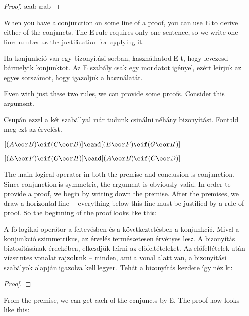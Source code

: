 \begin{proof}
	 \ae{ab}
	 \ae{ab}
\end{proof}



When you have a conjunction on some line of a proof, you can use {\eand}E to derive either of the conjuncts. The {\eand}E rule requires only one sentence, so we write one line number as the justification for applying it.

Ha konjunkció van egy bizonyítási sorban, használhatod {\eand}E-t, hogy levezesd bármelyik konjunktot. Az {\eand}E szabály csak egy mondatot igényel, ezért leírjuk az egyes sorszámot, hogy igazoljuk a használatát.

Even with just these two rules, we can provide some proofs. Consider this argument.

Csupán ezzel a két szabállyal már tudunk csinálni néhány bizonyítást.
Fontold meg ezt az érvelést.

\begin{earg}
\item[] $[(A\eor B)\eif(C\eor D)] \eand [(E \eor F) \eif (G\eor H)]$
\item[\therefore] $[(E \eor F) \eif (G\eor H)] \eand [(A\eor B)\eif(C\eor D)]$
\end{earg}
The main logical operator in both the premise and conclusion is conjunction. Since conjunction is symmetric, the argument is obviously valid. In order to provide a proof, we begin by writing down the premise. After the premises, we draw a horizontal line--- everything below this line must be justified by a rule of proof. So the beginning of the proof looks like this:

A fő logikai operátor a feltevésben és a következtetésben a konjunkció. Mivel a konjunkció szimmetrikus, az érvelés természetesen érvényes lesz. A bizonyítás biztosításának érdekében, elkezdjük leírni az előfeltételeket. Az előfeltételek után vízszintes vonalat rajzolunk -- minden, ami a vonal alatt van, a bizonyítási szabályok alapján igazolva kell legyen. Tehát a bizonyítás kezdete így néz ki:

\begin{proof}
\end{proof}

From the premise, we can get each of the conjuncts by {\eand}E. The proof now looks like this:

